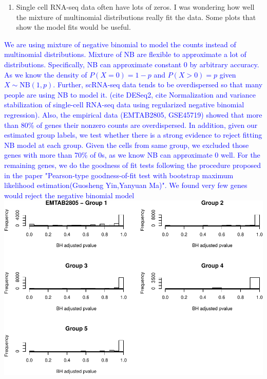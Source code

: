 \documentclass[]{article}
\providecommand{\tightlist}{%
  \setlength{\itemsep}{0pt}\setlength{\parskip}{0pt}}
\begin{document}
\begin{enumerate}
\def\labelenumi{(\arabic{enumi})}
\setcounter{enumi}{1}
\tightlist
\item
  Single cell RNA-seq data often have lots of zeros. I was wondering how
  well the mixture of multinomial distributions really fit the data.
  Some plots that show the model fits would be useful.
\end{enumerate}

\textcolor{blue}{We are using mixture of negative binomial to model the counts instead of multinomial distributions. Mixture of NB are flexible to approximate a lot of distributions. Specifically, NB can approximate constant 0 by arbitrary accuracy. As we know the density of $P(X = 0) = 1 - p$ and $P(X > 0) = p$ given $X \sim \text{NB}(1,p)$. Further, scRNA-seq data tends to be overdispersed so that many people are using NB to model it. (cite DESeq2, cite Normalization and variance stabilization of single-cell RNA-seq data using regularized negative binomial regression). Also, the empirical data (EMTAB2805, GSE45719) showed that more than 80\% of genes their nonzero counts are overdispersed. In addition, given our estimated group labels, we test whether there is a strong evidence to reject fitting NB model at each group. Given the cells from same group, we excluded those genes with more than 70\% of 0s, as we know NB can approximate 0 well. For the remaining genes, we do the goodness of fit tests following the procedure proposed in the paper "Pearson-type goodness-of-fit test with
bootstrap maximum likelihood
estimation(Guosheng Yin,Yanyuan Ma)". We found very few genes would reject the negative binomial model
} \includegraphics{Revision_files/figure-latex/unnamed-chunk-1-1.pdf}
\end{document}
